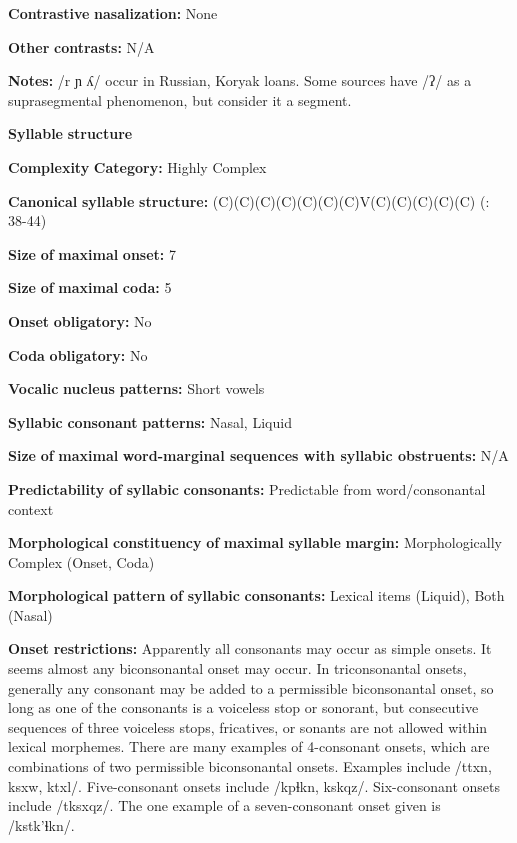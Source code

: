\textbf{Contrastive} \textbf{nasalization:} None

\textbf{Other} \textbf{contrasts:} N/A

\textbf{Notes:} /r ɲ ʎ/ occur in Russian, Koryak loans. Some sources have /ʔ/ as a suprasegmental phenomenon, but \citet{GeorgVolodin1999} consider it a segment. 

\textbf{Syllable} \textbf{structure}

\textbf{Complexity} \textbf{Category:} Highly Complex

\textbf{Canonical} \textbf{syllable} \textbf{structure:} (C)(C)(C)(C)(C)(C)(C)V(C)(C)(C)(C)(C) (\citealt{GeorgVolodin1999}: 38-44)

\textbf{Size} \textbf{of} \textbf{maximal} \textbf{onset:} 7

\textbf{Size} \textbf{of} \textbf{maximal} \textbf{coda:} 5

\textbf{Onset} \textbf{obligatory:} No

\textbf{Coda} \textbf{obligatory:} No

\textbf{Vocalic} \textbf{nucleus} \textbf{patterns:} Short vowels

\textbf{Syllabic} \textbf{consonant} \textbf{patterns:} Nasal, Liquid

\textbf{Size} \textbf{of} \textbf{maximal} \textbf{word{}-marginal sequences with syllabic obstruents:} N/A

\textbf{Predictability} \textbf{of} \textbf{syllabic} \textbf{consonants:} Predictable from word/consonantal context

\textbf{Morphological} \textbf{constituency} \textbf{of} \textbf{maximal} \textbf{syllable} \textbf{margin:} Morphologically Complex (Onset, Coda)

\textbf{Morphological} \textbf{pattern} \textbf{of} \textbf{syllabic} \textbf{consonants:} Lexical items (Liquid), Both (Nasal)

\textbf{Onset} \textbf{restrictions:} Apparently all consonants may occur as simple onsets. It seems almost any biconsonantal onset may occur. In triconsonantal onsets, generally any consonant may be added to a permissible biconsonantal onset, so long as one of the consonants is a voiceless stop or sonorant, but consecutive sequences of three voiceless stops, fricatives, or sonants are not allowed within lexical morphemes. There are many examples of 4-consonant onsets, which are combinations of two permissible biconsonantal onsets. Examples include /ttxn, ksxw, ktxl/. Five-consonant onsets include /kpɬkn, kskqz/. Six-consonant onsets include /tksxqz/. The one example of a seven-consonant onset given is /kstk’ɬkn/.

